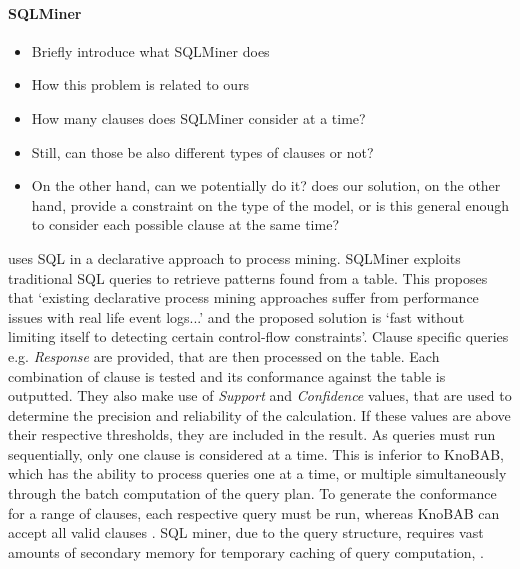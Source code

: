 \paragraph*{SQLMiner} \cite{Schonig15, SchonigRCJM16}
\begin{itemize}
	\item{Briefly introduce what SQLMiner does}
	\item{How this problem is related to ours}
	\item{How many clauses does SQLMiner consider at a time?}
	\item{Still, can those be also different types of clauses or not?}
	\item{On the other hand, can we potentially do it? does our solution, on the other hand, provide a constraint on the type of the model, or is this general enough to consider each possible clause at the same time?}
\end{itemize}
 uses SQL in a declarative approach to process mining. SQLMiner  exploits traditional SQL queries to retrieve patterns found from a table. This proposes that `existing declarative process mining approaches suffer from performance issues with real life event logs...' and the proposed solution is `fast without limiting itself to detecting certain control-flow constraints'. Clause specific queries e.g. \emph{Response} are provided, that are then processed on the table. Each combination of clause is tested and its conformance against the table is outputted. They also make use of \emph{Support} and \emph{Confidence} values, that are used to determine the precision and reliability of the calculation. If these values are above their respective thresholds, they are included in the result. As queries must run sequentially, only one clause is considered at a time. This is inferior to KnoBAB, which has the ability to process queries one at a time, or multiple simultaneously through the batch computation of the query plan. To generate the conformance for a range of clauses, each respective query must be run, whereas KnoBAB can accept all valid clauses . SQL miner, due to the query structure, requires vast amounts of secondary memory for temporary caching of query computation, .
